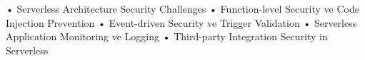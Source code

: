 • Serverless Architecture Security Challenges
• Function-level Security ve Code Injection Prevention
• Event-driven Security ve Trigger Validation
• Serverless Application Monitoring ve Logging
• Third-party Integration Security in Serverless
